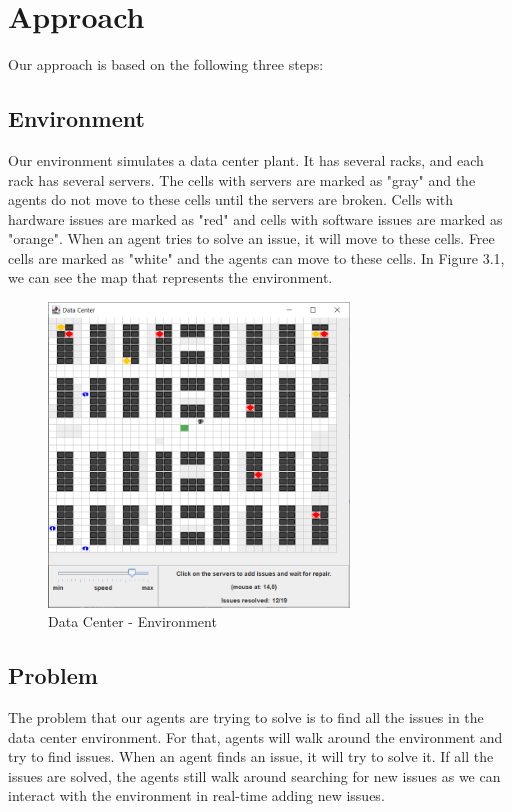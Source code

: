 \documentclass[letterpaper]{article}
\begin{document}
\section{Approach}\label{sec:approach}

Our approach is based on the following three steps:

\subsection{Environment}

Our environment simulates a data center plant. It has several racks, and each rack has several servers. The cells with servers are marked as "gray" and the agents do not move to these cells until the servers are broken. Cells with hardware issues are marked as "red" and cells with software issues are marked as "orange". When an agent tries to solve an issue, it will move to these cells. Free cells are marked as "white" and the agents can move to these cells. In Figure 3.1, we can see the map that represents the environment.

\begin{figure}[ht]
    \centering
    \includegraphics[width=8cm]{images/world.png}
    \caption{Data Center - Environment}
    \label{fig:data-center-env}
\end{figure}

\subsection{Problem}

The problem that our agents are trying to solve is to find all the issues in the data center environment. For that, agents will walk around the environment and try to find issues. When an agent finds an issue, it will try to solve it. If all the issues are solved, the agents still walk around searching for new issues as we can interact with the environment in real-time adding new issues.
\end{document}
